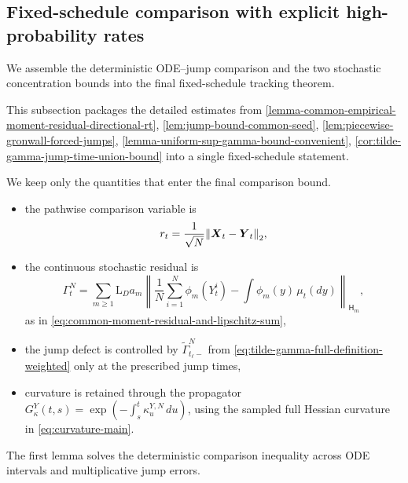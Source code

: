 \subsection{Fixed-schedule comparison with explicit high-probability rates}
\label{subsec:fixed-schedule-package}

We assemble the deterministic ODE--jump comparison and the two
stochastic concentration bounds into the final fixed-schedule tracking theorem.

This subsection packages the detailed estimates from
\cref{lemma-common-empirical-moment-residual-directional-rt},
\cref{lem:jump-bound-common-seed},
\cref{lem:piecewise-gronwall-forced-jumps},
\cref{lemma-uniform-sup-gamma-bound-convenient},
\cref{cor:tilde-gamma-jump-time-union-bound}
into a single fixed-schedule statement.  

We keep only the quantities that enter the final comparison bound.
\begin{itemize}
    \item the pathwise comparison variable is
    \[
    r_t=\frac{1}{\sqrt N}\norm{\boldsymbol{X}_t-\boldsymbol{Y}_t}_2,
    \]
    \item the continuous stochastic residual is
    \[
    \Gamma_t^N=\sum_{m\ge1}\mathrm L_Da_m
    \left\|\frac1N\sum_{i=1}^N\phi_m(Y_t^i)
                         -\int\phi_m(y)\,\mu_t(dy)\right\|_{\mathsf H_m},
    \]
    as in \eqref{eq:common-moment-residual-and-lipschitz-sum},
    \item the jump defect is controlled by $\widetilde\Gamma_{t_\ell-}^N$
    from \eqref{eq:tilde-gamma-full-definition-weighted} only at the prescribed jump times,
    \item curvature is retained through the propagator
    $G_\kappa^Y(t,s)=\exp(-\int_s^t\kappa_u^{Y,N}\,du)$, using the
    sampled full Hessian curvature in \eqref{eq:curvature-main}.
\end{itemize}

The first lemma solves the deterministic comparison inequality across ODE
intervals and multiplicative jump errors.


